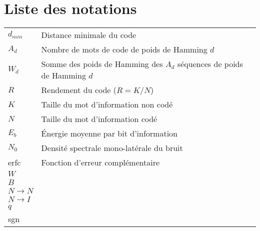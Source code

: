\chapter*{Liste des notations}
\begin{center}

\begin{longtable}{ p{}  p{} } 

$d_{min}$ 			&	Distance minimale du code 							\\
$A_d$	    		&	Nombre de mots de code de poids de Hamming $d$ 		\\
$W_d$	    		&	Somme des poids de Hamming des $A_d$ séquences de poids de Hamming $d$ \\
$R$					&	Rendement du code ($R=K/N$)							\\
$K$					&	Taille du mot d'information non codé 				\\
$N$					&	Taille du mot d'information codé 					\\ 
$E_b$       		&	Énergie moyenne par bit d'information 				\\
$N_0$				&	Densité spectrale mono-latérale du bruit 			\\
erfc 				&	Fonction d'erreur complémentaire					\\
$W$ 	  			&	 													\\
$B$ 	  			&	 													\\
$N\rightarrow N$	&	 													\\
$N\rightarrow I$	&	 													\\
$q$ 	 			&														\\
sgn 				&														\\
\end{longtable}

\end{center}
